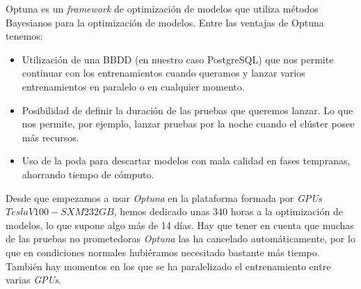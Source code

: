 Optuna es un \textit{framework} de optimización de modelos que utiliza métodos Bayesianos para la optimización de modelos.  Entre las ventajas de Optuna tenemos: 

\begin{itemize}
\item Utilización de una BBDD (en nuestro caso PostgreSQL) que nos permite continuar con los entrenamientos cuando queramos y lanzar varios entrenamientos en paralelo o en cualquier momento. 
\item Posibilidad de definir la duración de las pruebas que queremos lanzar. Lo que nos permite, por ejemplo, lanzar pruebas por la noche cuando el clúster posee más recursos.  

\item Uso de la poda para descartar modelos con mala calidad en fases tempranas, ahorrando tiempo de cómputo. 
\end{itemize}


Desde que empezamos a usar \textit{Optuna} en la plataforma formada por \textit{GPUs} $Tesla V100-SXM2 32GB$, hemos dedicado unas 340 horas a la optimización de modelos, lo que supone algo más de 14 días. Hay que tener en cuenta que muchas de las pruebas no prometedoras \textit{Optuna} las ha cancelado automáticamente, por lo que en condiciones normales hubiéramos necesitado bastante más tiempo. También hay momentos en los que se ha paralelizado el entrenamiento entre varias \textit{GPUs}.


